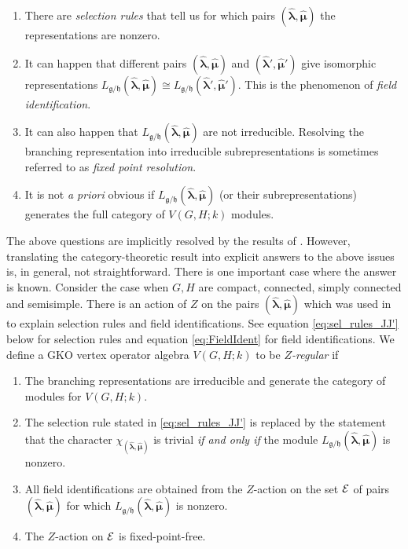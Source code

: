 \documentclass[a4paper,11pt]{article}
\newcommand{\hblm}{\hat{\bm{\lambda}}}
\newcommand{\hbmu}{\hat{\bm{\mu}}}
\newcommand{\tsf}[1]{\textsf{#1}}
\def\fg{\mathfrak{g}}
\def\fh{\mathfrak{h}}
\begin{document}
\begin{enumerate} 

\item There are \emph{selection rules} that tell us for which pairs $(\hblm,\hbmu)$ the representations are nonzero.  

\item It can happen that different pairs $(\hblm,\hbmu)$ and $(\hblm',\hbmu')$ give isomorphic 
representations $L_{\fg/\fh}(\hblm,\hbmu) \cong L_{\fg/\fh}(\hblm',\hbmu')$. This is the phenomenon of 
\emph{field identification}.

\item It can also happen that $L_{\fg/\fh}(\hblm,\hbmu)$ are not irreducible. Resolving the branching representation into irreducible subrepresentations is sometimes referred to as \emph{fixed point resolution}.  

\item It is not \emph{a priori} obvious if $L_{\fg/\fh}(\hblm,\hbmu)$ (or their subrepresentations) generates the full category of $V(G,H;k)$ modules. 


\end{enumerate}

The above questions are implicitly resolved by the results of \cite{Frohlich:2003hm,Frohlich:2003hg}. However, translating the category-theoretic result into explicit answers to the above issues is, in general, not straightforward. There is one 
important case where the answer is known. Consider the case when $G,H$ are compact, connected, simply connected and semisimple.
There is an action of $Z$ on the pairs $(\hblm,\hbmu)$ which was used in \cite{Moore:1989yh,gepner1989field,Schellekens:1989uf} to explain selection rules and field 
identifications. See equation \eqref{eq:sel_rules_JJ'} below for selection rules and 
equation \eqref{eq:FieldIdent} for field identifications.
We define  a \tsf{GKO} vertex operator algebra $V(G,H;k)$ to be \emph{$Z$-regular} if 

\begin{enumerate}
   
\item The branching representations are irreducible and generate the category of modules for $V(G,H;k)$. 

\item The selection rule stated in  \eqref{eq:sel_rules_JJ'} is replaced by the statement 
that the character $\chi_{(\hblm,\hbmu)}$ is trivial \textit{if and only if} the module $L_{\fg/\fh}(\hblm,\hbmu)$ is 
nonzero. 

\item All field identifications are obtained from the $Z$-action on the set $\cal{E}$ of pairs $(\hblm,\hbmu)$ for which $L_{\fg/\fh}(\hblm,\hbmu)$ is nonzero. 
\item The $Z$-action on $\cal{E}$ is fixed-point-free. 

\end{enumerate}
\end{document}
